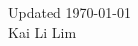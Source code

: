 
\begin{dedication} 
	\vspace*{\fill}
	\flushleft
	Updated \today\\
	\bigskip
	\textcopyright \the\year \hspace{3pt} Kai Li Lim\\
	
\end{dedication}



%
%
%

